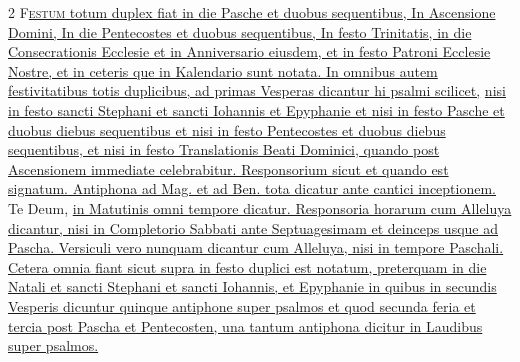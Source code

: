 \begin{multicols*}{2}
{\color{Red} }
\lettrine[lines=2]{\zallmancaps \color{Red} F}{}\ul{\textsc{estum} totum duplex fiat in die Pasche et duobus sequentibus, In Ascensione Domini, In die Pentecostes et duobus sequentibus, In festo Trinitatis, in die Consecrationis Ecclesie et in Anniversario eiusdem, et in festo Patroni Ecclesie Nostre, et in ceteris que in Kalendario sunt notata.
In omnibus autem festivitatibus totis duplicibus, ad primas Vesperas dicantur hi psalmi scilicet,}      \ul{nisi in festo sancti Stephani et sancti Iohannis et Epyphanie et nisi in festo Pasche et duobus diebus sequentibus et nisi in festo Pentecostes et duobus diebus sequentibus, et nisi in festo Translationis Beati Dominici, quando post Ascensionem immediate celebrabitur. Responsorium sicut et quando est signatum. Antiphona ad Mag. et ad Ben. tota dicatur ante cantici inceptionem.} Te Deum, \ul{in Matutinis omni tempore dicatur. Responsoria horarum cum Alleluya dicantur, nisi in Completorio Sabbati ante Septuagesimam et deinceps usque ad Pascha. Versiculi vero nunquam dicantur cum Alleluya, nisi in tempore Paschali.
Cetera omnia fiant sicut supra in festo duplici est notatum, preterquam in die Natali et sancti Stephani et sancti Iohannis, et Epyphanie in quibus in secundis Vesperis dicuntur quinque antiphone super psalmos et quod secunda feria et tercia post Pascha et Pentecosten, una tantum antiphona dicitur in Laudibus super psalmos.}


\end{multicols*}
